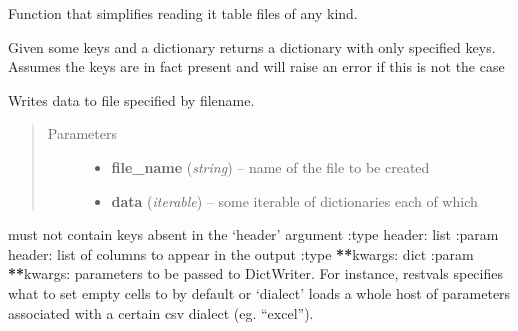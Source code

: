 \documentclass[letterpaper,10pt,english]{sphinxmanual}
\begin{document}

\begin{fulllineitems}
\label{test:gum.read_table}
Function that simplifies reading it table files of any kind.

\end{fulllineitems}


\begin{fulllineitems}
\label{test:gum.subset_dict}
Given some keys and a dictionary returns a dictionary with only
specified keys. Assumes the keys are in fact present and will raise an
error if this is not the case

\end{fulllineitems}


\begin{fulllineitems}
\label{test:gum.write_to_table}
Writes data to file specified by filename.
\begin{quote}\begin{description}
\item[{Parameters}] \leavevmode\begin{itemize}
\item {} 
\textbf{file\_name} (\emph{string}) -- name of the file to be created

\item {} 
\textbf{data} (\emph{iterable}) -- some iterable of dictionaries each of which

\end{itemize}

\end{description}\end{quote}

must not contain keys absent in the `header' argument
:type header: list
:param header: list of columns to appear in the output
:type {\color{red}\bfseries{}**}kwargs: dict
:param {\color{red}\bfseries{}**}kwargs: parameters to be passed to DictWriter.
For instance, restvals specifies what to set empty cells to by default or
`dialect' loads a whole host of parameters associated with a certain csv
dialect (eg. ``excel'').

\end{fulllineitems}
\end{document}
